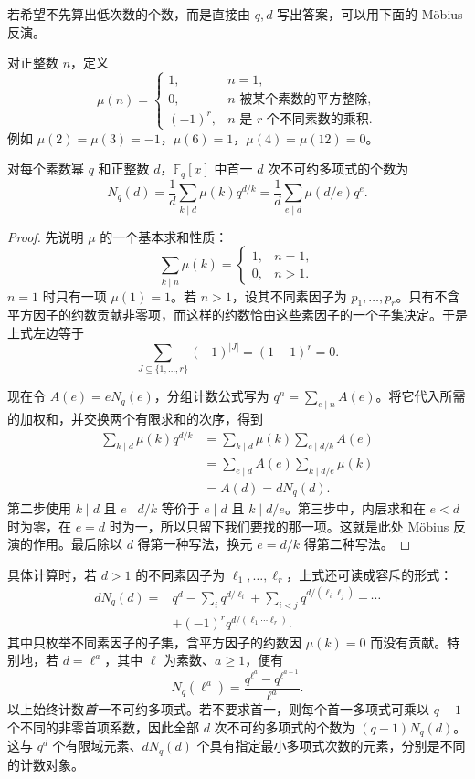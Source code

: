 \documentclass[lang=cn,a4paper,fontset=none,zihao=false,10pt,openany,twoside]{beautybook}
\numberwithin{algorithm}{chapter}
\begin{document}
若希望不先算出低次数的个数，而是直接由 $q,d$ 写出答案，可以用下面的 Möbius 反演。
\begin{definition}[Möbius 函数]
对正整数 $n$，定义
\[
 \mu(n)=
 \begin{cases}
  1,&n=1,\\
  0,&n\text{ 被某个素数的平方整除},\\
  (-1)^r,&n\text{ 是 }r\text{ 个不同素数的乘积}.
 \end{cases}
\]
例如 $\mu(2)=\mu(3)=-1$，$\mu(6)=1$，$\mu(4)=\mu(12)=0$。
\end{definition}
\begin{proposition}[不可约多项式的计数公式]\label{prop:irreducible-count-formula}
对每个素数幂 $q$ 和正整数 $d$，$\mathbb F_q[x]$ 中首一 $d$ 次不可约多项式的个数为
\[
 N_q(d)=\frac1d\sum_{k\mid d}\mu(k)q^{d/k}
       =\frac1d\sum_{e\mid d}\mu(d/e)q^e.
\]
\end{proposition}
\begin{proof}
先说明 $\mu$ 的一个基本求和性质：
\[
 \sum_{k\mid n}\mu(k)=
 \begin{cases}1,&n=1,\\0,&n>1.\end{cases}
\]
$n=1$ 时只有一项 $\mu(1)=1$。若 $n>1$，设其不同素因子为 $p_1,\ldots,p_r$。只有不含平方因子的约数贡献非零项，而这样的约数恰由这些素因子的一个子集决定。于是上式左边等于
\[
 \sum_{J\subseteq\{1,\ldots,r\}}(-1)^{|J|}
 =(1-1)^r=0.
\]

现在令 $A(e)=eN_q(e)$，分组计数公式写为 $q^n=\sum_{e\mid n}A(e)$。将它代入所需的加权和，并交换两个有限求和的次序，得到
\[
 \begin{aligned}
 \sum_{k\mid d}\mu(k)q^{d/k}
 &=\sum_{k\mid d}\mu(k)\sum_{e\mid d/k}A(e)\\
 &=\sum_{e\mid d}A(e)\sum_{k\mid d/e}\mu(k)\\
 &=A(d)=dN_q(d).
 \end{aligned}
\]
第二步使用 $k\mid d$ 且 $e\mid d/k$ 等价于 $e\mid d$ 且 $k\mid d/e$。第三步中，内层求和在 $e<d$ 时为零，在 $e=d$ 时为一，所以只留下我们要找的那一项。这就是此处 Möbius 反演的作用。最后除以 $d$ 得第一种写法，换元 $e=d/k$ 得第二种写法。
\end{proof}

具体计算时，若 $d>1$ 的不同素因子为 $\ell_1,\ldots,\ell_r$，上式还可读成容斥的形式：
\[
 \begin{aligned}
 dN_q(d)={}&q^d-\sum_i q^{d/\ell_i}
 +\sum_{i<j}q^{d/(\ell_i\ell_j)}-\cdots\\
 &+(-1)^r q^{d/(\ell_1\cdots\ell_r)}.
 \end{aligned}
\]
其中只枚举不同素因子的子集，含平方因子的约数因 $\mu(k)=0$ 而没有贡献。特别地，若 $d=\ell^a$，其中 $\ell$ 为素数、$a\ge1$，便有
\[
 N_q(\ell^a)=\frac{q^{\ell^a}-q^{\ell^{a-1}}}{\ell^a}.
\]
以上始终计数\emph{首一}不可约多项式。若不要求首一，则每个首一多项式可乘以 $q-1$ 个不同的非零首项系数，因此全部 $d$ 次不可约多项式的个数为 $(q-1)N_q(d)$。这与 $q^d$ 个有限域元素、$dN_q(d)$ 个具有指定最小多项式次数的元素，分别是不同的计数对象。
\end{document}
